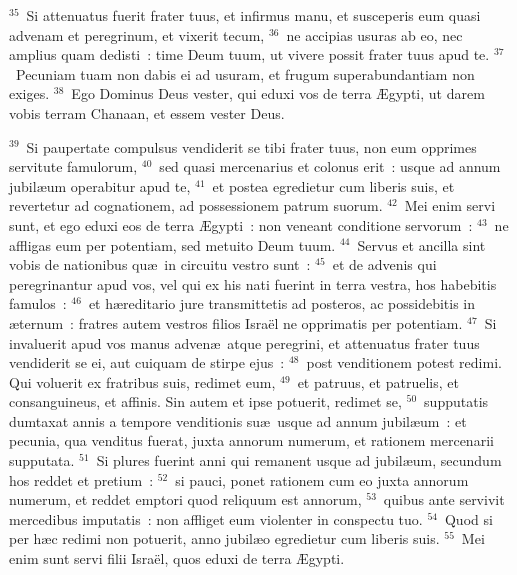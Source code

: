 ${}^{35}$~Si attenuatus fuerit frater tuus, et infirmus manu, et susceperis eum quasi advenam et peregrinum, et vixerit tecum,
${}^{36}$~ne accipias usuras ab eo, nec amplius quam dedisti~: time Deum tuum, ut vivere possit frater tuus apud te.
${}^{37}$~Pecuniam tuam non dabis ei ad usuram, et frugum superabundantiam non exiges.
${}^{38}$~Ego Dominus Deus vester, qui eduxi vos de terra \AE gypti, ut darem vobis terram Chanaan, et essem vester Deus.


${}^{39}$~Si paupertate compulsus vendiderit se tibi frater tuus, non eum opprimes servitute famulorum,
${}^{40}$~sed quasi mercenarius et colonus erit~: usque ad annum jubil\ae um operabitur apud te,
${}^{41}$~et postea egredietur cum liberis suis, et revertetur ad cognationem, ad possessionem patrum suorum.
${}^{42}$~Mei enim servi sunt, et ego eduxi eos de terra \AE gypti~: non veneant conditione servorum~:
${}^{43}$~ne affligas eum per potentiam, sed metuito Deum tuum.
${}^{44}$~Servus et ancilla sint vobis de nationibus qu\ae\ in circuitu vestro sunt~:
${}^{45}$~et de advenis qui peregrinantur apud vos, vel qui ex his nati fuerint in terra vestra, hos habebitis famulos~:
${}^{46}$~et h\ae reditario jure transmittetis ad posteros, ac possidebitis in \ae ternum~: fratres autem vestros filios Isra\"el ne opprimatis per potentiam.
${}^{47}$~Si invaluerit apud vos manus adven\ae\ atque peregrini, et attenuatus frater tuus vendiderit se ei, aut cuiquam de stirpe ejus~:
${}^{48}$~post venditionem potest redimi. Qui voluerit ex fratribus suis, redimet eum,
${}^{49}$~et patruus, et patruelis, et consanguineus, et affinis. Sin autem et ipse potuerit, redimet se,
${}^{50}$~supputatis dumtaxat annis a tempore venditionis su\ae\ usque ad annum jubil\ae um~: et pecunia, qua venditus fuerat, juxta annorum numerum, et rationem mercenarii supputata.
${}^{51}$~Si plures fuerint anni qui remanent usque ad jubil\ae um, secundum hos reddet et pretium~:
${}^{52}$~si pauci, ponet rationem cum eo juxta annorum numerum, et reddet emptori quod reliquum est annorum,
${}^{53}$~quibus ante servivit mercedibus imputatis~: non affliget eum violenter in conspectu tuo.
${}^{54}$~Quod si per h\ae c redimi non potuerit, anno jubil\ae o egredietur cum liberis suis.
${}^{55}$~Mei enim sunt servi filii Isra\"el, quos eduxi de terra \AE gypti.

